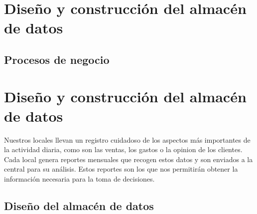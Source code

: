 \documentclass[12pt]{opticajnl}
\begin{document}


\section{Diseño y construcción del almacén de datos}

\subsection{Procesos de negocio}




\section{Diseño y construcción del almacén de datos}

Nuestros locales llevan un registro cuidadoso de los aspectos más importantes de la actividad diaria, como son las ventas, los gastos o la opinion de los clientes. Cada local genera reportes mensuales que recogen estos datos y son enviados a la central para su análisis. Estos reportes son los que nos permitirán obtener la información necesaria para la toma de decisiones. 

\subsection{Diseño del almacén de datos}
\end{document}
